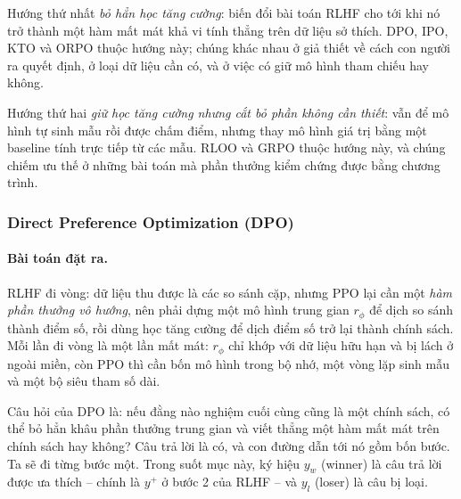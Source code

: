 Hướng thứ nhất \emph{bỏ hẳn học tăng cường}: biến đổi bài toán RLHF cho tới khi nó trở thành một hàm mất mát khả vi tính thẳng trên dữ liệu sở thích. DPO, IPO, KTO và ORPO thuộc hướng này; chúng khác nhau ở giả thiết về cách con người ra quyết định, ở loại dữ liệu cần có, và ở việc có giữ mô hình tham chiếu hay không.

Hướng thứ hai \emph{giữ học tăng cường nhưng cắt bỏ phần không cần thiết}: vẫn để mô hình tự sinh mẫu rồi được chấm điểm, nhưng thay mô hình giá trị bằng một baseline tính trực tiếp từ các mẫu. RLOO và GRPO thuộc hướng này, và chúng chiếm ưu thế ở những bài toán mà phần thưởng kiểm chứng được bằng chương trình.

\subsubsection{Direct Preference Optimization (DPO)}
\label{ssec:dpo}

\paragraph{Bài toán đặt ra.}
RLHF đi vòng: dữ liệu thu được là các so sánh cặp, nhưng PPO lại cần một \emph{hàm phần thưởng vô hướng}, nên phải dựng một mô hình trung gian \( r_{\phi} \) để dịch so sánh thành điểm số, rồi dùng học tăng cường để dịch điểm số trở lại thành chính sách. Mỗi lần đi vòng là một lần mất mát: \( r_{\phi} \) chỉ khớp với dữ liệu hữu hạn và bị lách ở ngoài miền, còn PPO thì cần bốn mô hình trong bộ nhớ, một vòng lặp sinh mẫu và một bộ siêu tham số dài.

Câu hỏi của DPO \cite{rafailov2023direct} là: nếu đằng nào nghiệm cuối cùng cũng là một chính sách, có thể bỏ hẳn khâu phần thưởng trung gian và viết thẳng một hàm mất mát trên chính sách hay không? Câu trả lời là có, và con đường dẫn tới nó gồm bốn bước. Ta sẽ đi từng bước một. Trong suốt mục này, ký hiệu \( y_w \) (winner) là câu trả lời được ưa thích -- chính là \( y^+ \) ở bước 2 của RLHF -- và \( y_l \) (loser) là câu bị loại.

